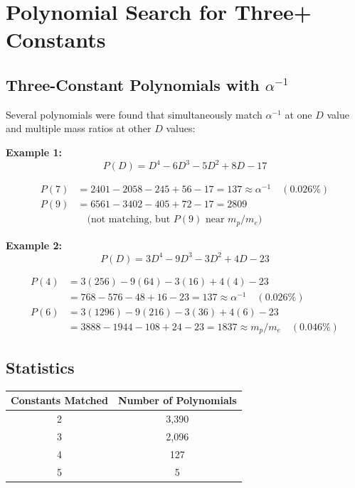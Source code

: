 \documentclass[11pt,a4paper]{article}
\begin{document}
\section{Polynomial Search for Three+ Constants}

\subsection{Three-Constant Polynomials with $\alpha^{-1}$}

Several polynomials were found that simultaneously match $\alpha^{-1}$ at one $D$ value and multiple mass ratios at other $D$ values:

\textbf{Example 1:}
\begin{equation}
P(D) = D^4 - 6D^3 - 5D^2 + 8D - 17
\end{equation}

\begin{align}
P(7) &= 2401 - 2058 - 245 + 56 - 17 = 137 \approx \alpha^{-1} \quad (0.026\%) \\
P(9) &= 6561 - 3402 - 405 + 72 - 17 = 2809 \\
&\quad \text{(not matching, but } P(9) \text{ near } m_p/m_e \text{)}
\end{align}

\textbf{Example 2:}
\begin{equation}
P(D) = 3D^4 - 9D^3 - 3D^2 + 4D - 23
\end{equation}

\begin{align}
P(4) &= 3(256) - 9(64) - 3(16) + 4(4) - 23 \\
     &= 768 - 576 - 48 + 16 - 23 = 137 \approx \alpha^{-1} \quad (0.026\%) \\
P(6) &= 3(1296) - 9(216) - 3(36) + 4(6) - 23 \\
     &= 3888 - 1944 - 108 + 24 - 23 = 1837 \approx m_p/m_e \quad (0.046\%)
\end{align}

\subsection{Statistics}

\begin{center}
\begin{tabular}{cc}
\hline
Constants Matched & Number of Polynomials \\
\hline
2 & 3,390 \\
3 & 2,096 \\
4 & 127 \\
5 & 5 \\
\hline
\end{tabular}
\end{center}
\end{document}
